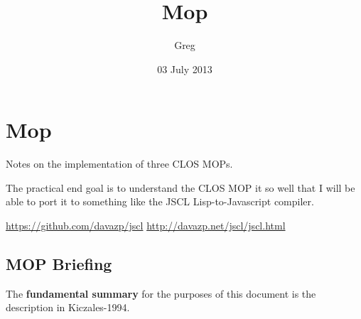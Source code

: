 \documentclass[11pt]{article}
\title{Mop}
\author{Greg}
\date{03 July 2013}
\begin{document}
\maketitle

\setcounter{tocdepth}{3}
\tableofcontents
\vspace*{1cm}
\section{Mop}
\label{sec-1}

Notes on the implementation of three CLOS MOPs.

The practical end goal is to understand the CLOS
MOP it so well that I will be able to port it to 
something like the JSCL Lisp-to-Javascript compiler.

\href{https://github.com/davazp/jscl}{https://github.com/davazp/jscl}
\href{http://davazp.net/jscl/jscl.html}{http://davazp.net/jscl/jscl.html}

\subsection{MOP Briefing}
\label{sec-1.1}

The \textbf{fundamental summary} for the purposes of this
document is the description in Kiczales-1994. 
\end{document}
